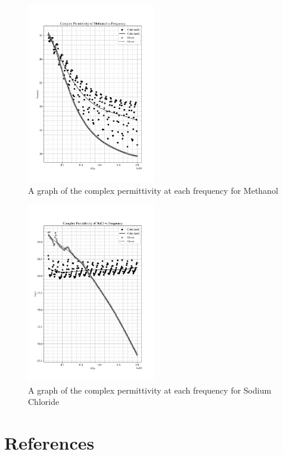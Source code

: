 \documentclass[12pt, a4paper]{article}
\begin{document}
\begin{multicols*}{2}
\begin{figure}[H]
    \centering
    \includegraphics[width = 0.5\textwidth]{Plot1.png}\caption{A graph of the complex permittivity at each frequency for Methanol}\label{fig: Methanol Graph}
\end{figure}

\begin{figure}[H]
    \centering
    \includegraphics[width = 0.5\textwidth]{Plot2.png}\caption{A graph of the complex permittivity at each frequency for Sodium Chloride}\label{fig: NaCl Graph}
\end{figure}

\end{multicols*}

\section{References}
\printbibliography[heading = none]
\end{document}
